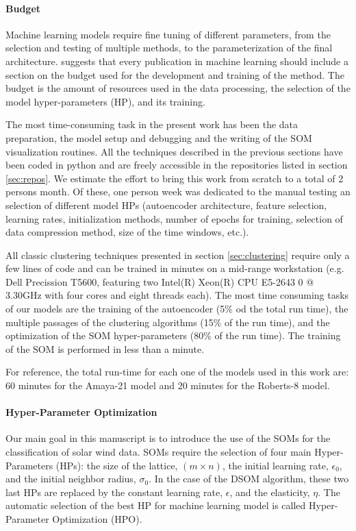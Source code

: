 \paragraph{Budget}
Machine learning models require fine tuning of different parameters, from the selection and testing of multiple methods, to the parameterization of the final architecture. \citep{Dodge2019} suggests that every publication in machine learning should include a section on the budget used for the development and training of the method. The budget is the amount of resources used in the data processing, the selection of the model hyper-parameters (HP), and its training.

The most time-consuming task in the present work has been the data preparation, the model setup and debugging and the writing of the SOM visualization routines. All the techniques described in the previous sections have been coded in python and are freely accessible in the repositories listed in section \ref{sec:repos}. We estimate the effort to bring this work from scratch to a total of 2 persons month. Of these, one person week was dedicated to the manual testing an selection of different model HPs (autoencoder architecture, feature selection, learning rates, initialization methods, number of epochs for training, selection of data compression method, size of the time windows, etc.).

All classic clustering techniques presented in section \ref{sec:clustering} require only a few lines of code and can be trained in minutes on a mid-range workstation (e.g. Dell Precission T5600, featuring two Intel(R) Xeon(R) CPU E5-2643 0 @ 3.30GHz with four cores and eight threads each). The most time consuming tasks of our models are the training of the autoencoder (5\% od the total run time), the multiple passages of the clustering algorithms (15\% of the run time), and the optimization of the SOM hyper-parameters (80\% of the run time). The training of the SOM is performed in less than a minute.

For reference, the total run-time for each one of the models used in this work are: 60 minutes for the Amaya-21 model and 20 minutes for the Roberts-8 model.

\paragraph{Hyper-Parameter Optimization}
Our main goal in this manuscript is to introduce the use of the SOMs for the classification of solar wind data. SOMs require the selection of four main Hyper-Parameters (HPs): the size of the lattice, $(m\times n)$, the initial learning rate, $\epsilon_0$, and the initial neighbor radius, $\sigma_0$. In the case of the DSOM algorithm, these two last HPs are replaced by the constant learning rate, $\epsilon$, and the elasticity, $\eta$. The automatic selection of the best HP for machine learning model is called Hyper-Parameter Optimization (HPO).

